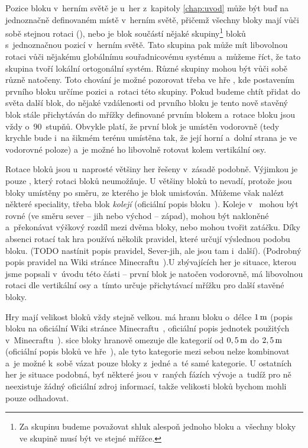 Pozice bloku v~herním světě je u~her z~kapitoly \ref{chap:uvod} může být buď na jednoznačně definovaném místě v~herním světě, přičemž všechny bloky mají vůči sobě stejnou rotaci (\MC{}), nebo je blok součástí nějaké skupiny\footnote{Za skupinu budeme považovat shluk alespoň jednoho bloku a~všechny bloky ve skupině musí být ve stejné mřížce.} bloků s~jednoznačnou pozicí v~herním světě. Tato skupina pak může mít libovolnou rotaci vůči nějakému globálnímu souřadnicovému systému a~můžeme říct, že tato skupina tvoří lokální ortogonální systém. Různé skupiny mohou být vůči sobě různě natočeny. Toto chování je možné pozorovat třeba ve hře \ME{}, kde postavením prvního bloku určíme pozici a~rotaci této skupiny. Pokud budeme chtít přidat do světa další blok, do nějaké vzdálenosti od prvního bloku je tento nově stavěný blok stále přichytáván do mřížky definované prvním blokem a~rotace bloku jsou vždy o~90~stupňů. Obvykle platí, že první blok je umístěn vodorovně (tedy krychle bude i~na šikmém terénu umístěna tak, že její horní a~dolní strana je ve vodorovné poloze) a~je možné ho libovolně rotovat kolem vertikální osy.

Rotace bloků jsou u~naprosté většiny her řešeny v~zásadě podobně. Výjimkou je pouze \MC{}, který rotaci bloků neumožňuje. U většiny bloků to nevadí, protože jsou bloky umístěny po směru, ze kterého je blok umisťován. Můžeme však nalézt některé speciality, třeba blok \textit{kolejí} (oficiální popis bloku~\citep{mc_rail}). Koleje v~ mohou být rovné (ve směru sever -- jih nebo východ -- západ), mohou být nakloněné a~překonávat výškový rozdíl mezi dvěma bloky, nebo mohou tvořit zatáčku. Díky absenci rotací tak hra používá několik pravidel, které určují výslednou podobu bloku. (TODO nastínit popis pravidel, Sever-jih, ale jsou tam i~další). (Podrobný popis pravidel na Wiki stránce Minecraftu~\citep{mc_rail}).U zbývajících her je situace, kterou jsme popsali v~úvodu této části -- první blok je natočen vodorovně, má libovolnou rotaci dle vertikální osy a~tímto určuje přichytávací mřížku pro další stavěné bloky.

Hry mají velikost bloků vždy stejně velkou. \MC{} má hranu bloku o~délce $1\,\rm m$ (popis bloku na oficiální Wiki stránce Minecraftu~\citep{mc_block}, oficiální popis jednotek použitých v~Minecraftu~\citep{mc_units}). \SE{} sice bloky hranově omezuje dle kategorií od $0,5\,\rm m$ do $2,5\,\rm m$ (oficiální popis bloků ve hře~\citep{se_blocks_wiki}), ale tyto kategorie mezi sebou nelze kombinovat a~je možné k~sobě vázat pouze bloky z~jedné a~té samé kategorie. U ostatních her je situace podobná, byť některé jsou v~raných fázích vývoje a~tudíž pro ně neexistuje žádný oficiální zdroj informací, takže velikosti bloků bychom mohli pouze odhadovat. 

